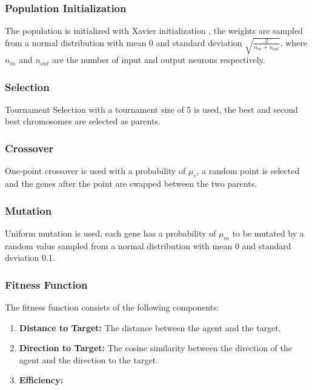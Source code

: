 \documentclass[sigconf]{acmart}
\begin{document}
\subsubsection{Population Initialization} The population is initialized with Xavier initialization \cite{Xavier_pmlr-v9-glorot10a}, the weights are sampled from a normal distribution with mean 0 and standard deviation $\sqrt{\frac{2}{n_{in} + n_{out}}}$, where $n_{in}$ and $n_{out}$ are the number of input and output neurons respectively.
\subsubsection{Selection} Tournament Selection with a tournament size of 5 is used, the best and second best chromosomes are selected as parents.
\subsubsection{Crossover} One-point crossover is used with a probability of $\mu_c$, a random point is selected and the genes after the point are swapped between the two parents.
\subsubsection{Mutation} Uniform mutation is used, each gene has a probability of $\mu_m$ to be mutated by a random value sampled from a normal distribution with mean 0 and standard deviation 0.1.
\subsubsection{Fitness Function}
The fitness function consists of the following components:
\begin{enumerate}
  \item \textbf{Distance to Target:} The distance between the agent and the target.
  \item \textbf{Direction to Target:} The cosine similarity between the direction of the agent and the direction to the target.
  \item \textbf{Efficiency:} 
\end{enumerate}
\end{document}
